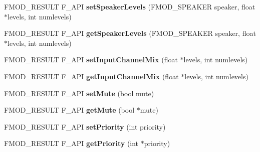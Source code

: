 \begin{DoxyCompactItemize}
\item 
F\+M\+O\+D\+\_\+\+R\+E\+S\+U\+LT F\+\_\+\+A\+PI {\bfseries set\+Speaker\+Levels} (F\+M\+O\+D\+\_\+\+S\+P\+E\+A\+K\+ER speaker, float $\ast$levels, int numlevels)\hypertarget{class_f_m_o_d_1_1_channel_aa32c97cb14d3da622393d7406c9f0ca3}{}\label{class_f_m_o_d_1_1_channel_aa32c97cb14d3da622393d7406c9f0ca3}

\item 
F\+M\+O\+D\+\_\+\+R\+E\+S\+U\+LT F\+\_\+\+A\+PI {\bfseries get\+Speaker\+Levels} (F\+M\+O\+D\+\_\+\+S\+P\+E\+A\+K\+ER speaker, float $\ast$levels, int numlevels)\hypertarget{class_f_m_o_d_1_1_channel_aadb8b4003e6b716331d280a7f22a6f51}{}\label{class_f_m_o_d_1_1_channel_aadb8b4003e6b716331d280a7f22a6f51}

\item 
F\+M\+O\+D\+\_\+\+R\+E\+S\+U\+LT F\+\_\+\+A\+PI {\bfseries set\+Input\+Channel\+Mix} (float $\ast$levels, int numlevels)\hypertarget{class_f_m_o_d_1_1_channel_a4695dfbef85dece725468e690053ca00}{}\label{class_f_m_o_d_1_1_channel_a4695dfbef85dece725468e690053ca00}

\item 
F\+M\+O\+D\+\_\+\+R\+E\+S\+U\+LT F\+\_\+\+A\+PI {\bfseries get\+Input\+Channel\+Mix} (float $\ast$levels, int numlevels)\hypertarget{class_f_m_o_d_1_1_channel_ab893172c11ceab2bb254707b1b2d263e}{}\label{class_f_m_o_d_1_1_channel_ab893172c11ceab2bb254707b1b2d263e}

\item 
F\+M\+O\+D\+\_\+\+R\+E\+S\+U\+LT F\+\_\+\+A\+PI {\bfseries set\+Mute} (bool mute)\hypertarget{class_f_m_o_d_1_1_channel_a0b0d4a7d28c0e57daeb8c1c39fb06379}{}\label{class_f_m_o_d_1_1_channel_a0b0d4a7d28c0e57daeb8c1c39fb06379}

\item 
F\+M\+O\+D\+\_\+\+R\+E\+S\+U\+LT F\+\_\+\+A\+PI {\bfseries get\+Mute} (bool $\ast$mute)\hypertarget{class_f_m_o_d_1_1_channel_acc5cfb7cd503c24210ab7ffbbdbbea0e}{}\label{class_f_m_o_d_1_1_channel_acc5cfb7cd503c24210ab7ffbbdbbea0e}

\item 
F\+M\+O\+D\+\_\+\+R\+E\+S\+U\+LT F\+\_\+\+A\+PI {\bfseries set\+Priority} (int priority)\hypertarget{class_f_m_o_d_1_1_channel_a83a9a2f49e4bdde446f0d574847f5329}{}\label{class_f_m_o_d_1_1_channel_a83a9a2f49e4bdde446f0d574847f5329}

\item 
F\+M\+O\+D\+\_\+\+R\+E\+S\+U\+LT F\+\_\+\+A\+PI {\bfseries get\+Priority} (int $\ast$priority)\hypertarget{class_f_m_o_d_1_1_channel_ae2a16710e706c0223937bc99fb3cad3d}{}\label{class_f_m_o_d_1_1_channel_ae2a16710e706c0223937bc99fb3cad3d}


\end{DoxyCompactItemize}
